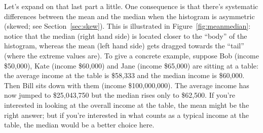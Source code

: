Let's expand on that last part a little. One consequence is that there's systematic differences between the mean and the median when the histogram is asymmetric (skewed; see Section~\ref{sec:skew}). This is illustrated in Figure~\ref{fig:meanmedian}: notice that the median (right hand side) is located closer to the ``body'' of the histogram, whereas the mean (left hand side) gets dragged towards the ``tail'' (where the extreme values are). To give a concrete example, suppose Bob (income \$50,000), Kate (income \$60,000) and Jane (income \$65,000) are sitting at a table: the average income at the table is \$58,333 and the median income is \$60,000. Then Bill sits down with them (income \$100,000,000). The average income has now jumped to \$25,043,750 but the median rises only to \$62,500. If you're interested in looking at the overall income at the table, the mean might be the right answer; but if you're interested in what counts as a typical income at the table, the median would be a better choice here.



